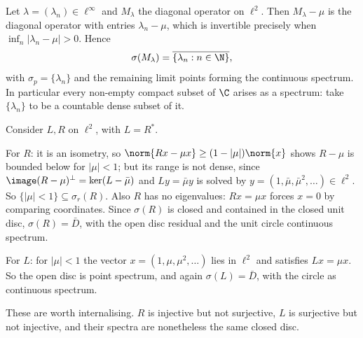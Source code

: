 \begin{center}
\end{center}

\begin{example}
	Let $\lambda = (\lambda_n)\in\ell^\infty$ and $M_\lambda$ the diagonal operator on $\ell^2$. Then $M_\lambda - \mu$ is the diagonal operator with entries $\lambda_n - \mu$, which is invertible precisely when $\inf_n|\lambda_n-\mu|>0$. Hence
	$$\sigma(M_\lambda) = \overline{\{\lambda_n : n \in\N\}},$$
	with $\sigma_p = \{\lambda_n\}$ and the remaining limit points forming the continuous spectrum. In particular every non-empty compact subset of $\C$ arises as a spectrum: take $\{\lambda_n\}$ to be a countable dense subset of it.
\end{example}

\begin{example}
	Consider $L, R$ on $\ell^2$, with $L = R^*$.

	For $R$: it is an isometry, so $\norm{Rx-\mu x}\geq(1-|\mu|)\norm{x}$ shows $R - \mu$ is bounded below for $|\mu|<1$; but its range is not dense, since $\image(R-\mu)^\perp = \ker(L - \bar\mu)$ and $L y = \bar\mu y$ is solved by $y = (1, \bar\mu, \bar\mu^2, \dots)\in\ell^2$. So $\{|\mu|<1\}\subseteq\sigma_r(R)$. Also $R$ has no eigenvalues: $Rx = \mu x$ forces $x = 0$ by comparing coordinates. Since $\sigma(R)$ is closed and contained in the closed unit disc, $\sigma(R) = \bar{D}$, with the open disc residual and the unit circle continuous spectrum.

	For $L$: for $|\mu|<1$ the vector $x = (1,\mu,\mu^2,\dots)$ lies in $\ell^2$ and satisfies $Lx = \mu x$. So the open disc is point spectrum, and again $\sigma(L)=\bar D$, with the circle as continuous spectrum.

	These are worth internalising. $R$ is injective but not surjective, $L$ is surjective but not injective, and their spectra are nonetheless the same closed disc.
\end{example}

